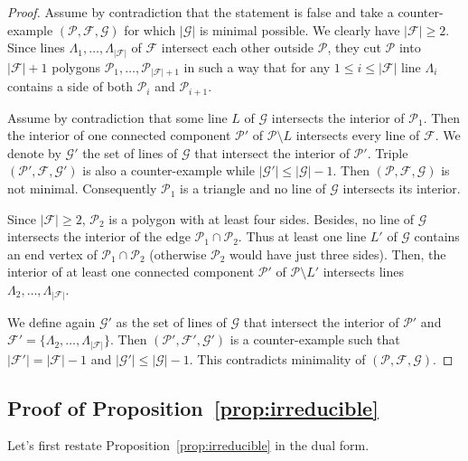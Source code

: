 \documentclass[a4paper,11pt,reqno]{amsart}
\theoremstyle{definition}
\theoremstyle{remark}
\theoremstyle{definition}
\theoremstyle{definition}
\theoremstyle{definition}
\numberwithin{equation}{section}
\begin{document}
\begin{proof}
Assume by contradiction that the statement is false and take  a counter-example $(\mathcal{P},\mathcal{F},\mathcal{G})$  for which  $|\mathcal{G}|$ is minimal possible. We clearly have $|\mathcal{F}| \geq 2$. Since lines $\Lambda_{1},\dots,\Lambda_{|\mathcal{F}|}$ of $\mathcal{F}$ intersect each other outside $\mathcal{P}$, they cut $\mathcal{P}$ into $|\mathcal{F}|+1$ polygons $\mathcal{P}_{1},\dots,\mathcal{P}_{|\mathcal{F}|+1}$ in such a way that for any $1 \leq i \leq |\mathcal{F}|$ line $\Lambda_{i}$ contains a side of both $\mathcal{P}_{i}$ and $\mathcal{P}_{i+1}$.
\par
Assume by contradiction that some line $L$ of $\mathcal{G}$ intersects the interior of $\mathcal{P}_{1}$. Then the interior of one connected component $\mathcal{P}'$ of $\mathcal{P}\setminus L$ intersects every line of $\mathcal{F}$. We denote by $\mathcal{G}'$ the set of lines of $\mathcal{G}$ that intersect the interior of $\mathcal{P}'$. Triple $(\mathcal{P}',\mathcal{F},\mathcal{G}')$ is also a counter-example while $|\mathcal{G}'|\leq |\mathcal{G}|-1$. Then $(\mathcal{P},\mathcal{F},\mathcal{G})$ is not minimal. Consequently $\mathcal{P}_{1}$ is a triangle and no line of $\mathcal{G}$ intersects its interior.
\par
Since $|\mathcal{F}|\geq 2$, $\mathcal{P}_{2}$ is a polygon with at least four sides. Besides, no line of $\mathcal{G}$ intersects the interior of the edge $\mathcal{P}_{1} \cap \mathcal{P}_{2}$. Thus at least one line $L'$ of $\mathcal{G}$ contains an end vertex of $\mathcal{P}_{1} \cap \mathcal{P}_{2}$ (otherwise $\mathcal{P}_{2}$ would have just three sides). Then,
the interior of at least one connected component $\mathcal{P}'$ of $\mathcal{P} \setminus L'$ intersects lines $\Lambda_{2},\dots,\Lambda_{|\mathcal{F}|}$.
\par
We define again $\mathcal{G}'$ as the set of lines of $\mathcal{G}$ that intersect the interior of $\mathcal{P}'$ and $\mathcal{F}'= \lbrace{ \Lambda_{2},\dots,\Lambda_{|\mathcal{F}|}\rbrace}$. Then $(\mathcal{P}',\mathcal{F}',\mathcal{G}')$ is a counter-example such that $|\mathcal{F}'|=|\mathcal{F}|-1$ and $|\mathcal{G}'|\leq |\mathcal{G}|-1$. This contradicts minimality of $(\mathcal{P},\mathcal{F},\mathcal{G})$.
\end{proof}

\subsection{Proof of Proposition~\ref{prop:irreducible}}\label{sub:Reduction}
Let's first restate  Proposition~\ref{prop:irreducible} in the dual form.
\end{document}
